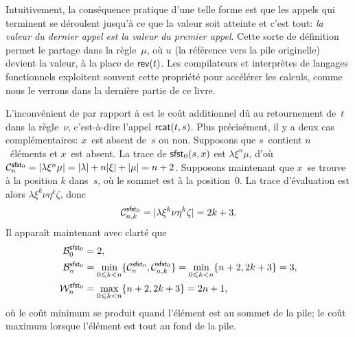 Intuitivement, la conséquence pratique d'une telle forme est que les
appels qui terminent se déroulent jusqu'à ce que la valeur soit
atteinte et c'est tout: \emph{la valeur du dernier appel est la valeur
du premier appel}. Cette sorte de définition permet le partage dans la
règle~\(\mu\), où \(u\) (la référence vers la pile originelle) devient
la valeur, à la place de \(\fun{rev}(t)\). Les compilateurs et
interprètes de langages fonctionnels exploitent souvent cette
propriété pour accélérer les calculs, comme nous le verrons dans la
dernière partie de ce livre.

L'inconvénient de  par rapport à  est le
coût additionnel dû au retournement de~\(t\) dans la règle~\(\nu\),
c'est-à-dire l'appel \(\fun{rcat}(t,s)\). Plus précisément, il y a
deux cas complémentaires: \(x\)~est absent de~\(s\) ou non. Supposons
que \(s\)~contient \(n\)~éléments et \(x\)~est absent. La trace
 de \(\fun{sfst}_0(s,x)\)
est \(\lambda\xi^n\mu\), d'où \(\C{\fun{sfst}_0}{n} =
\len{\lambda\xi^n\mu} = \len{\lambda} + n \len{\xi} + \len{\mu} = n +
2\). Supposons maintenant que \(x\)~se trouve à la position \(k\)
dans~\(s\), où le sommet est à la position~\(0\). La trace
d'évaluation est alors \(\lambda \xi^{k}\nu\eta^k\zeta\), donc
\begin{equation*}
  \C{\fun{sfst}_0}{n,k} = \len{\lambda \xi^{k}\nu\eta^k\zeta} = 2k + 3.
\end{equation*}
Il apparaît maintenant avec clarté que
\begin{align*}
\B{\fun{sfst}_0}{0} & = 2,\\
\B{\fun{sfst}_0}{n} & = \min_{0 \leqslant k < n}\{\C{\fun{sfst}_0}{n}, \C{\fun{sfst}_0}{n,k}\}
                    = \min_{0 \leqslant k < n}\{n+2,2k+3\} = 3,\\
\W{\fun{sfst}_0}{n} & = \max_{0 \leqslant k < n}\{n+2,2k+3\} = 2n+1,
\end{align*}
où le coût minimum se produit quand l'élément est au sommet de la
pile; le coût maximum lorsque l'élément est tout au fond de la pile.

